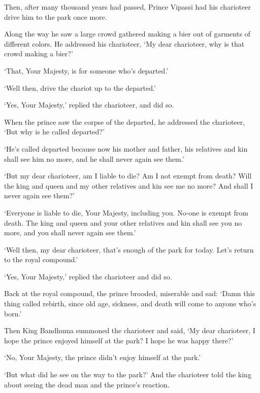\documentclass[12pt,openany]{book}%
\begin{document}
Then, after many thousand years had passed, Prince \textsanskrit{Vipassī} had his charioteer drive him to the park once more. 

Along the way he saw a large crowd gathered making a bier out of garments of different colors. He addressed his charioteer, ‘My dear charioteer, why is that crowd making a bier?’ 

‘That, Your Majesty, is for someone who’s departed.’ 

‘Well then, drive the chariot up to the departed.’ 

‘Yes, Your Majesty,’ replied the charioteer, and did so. 

When the prince saw the corpse of the departed, he addressed the charioteer, ‘But why is he called departed?’ 

‘He’s called departed because now his mother and father, his relatives and kin shall see him no more, and he shall never again see them.’ 

‘But my dear charioteer, am I liable to die? Am I not exempt from death? Will the king and queen and my other relatives and kin see me no more? And shall I never again see them?’ 

‘Everyone is liable to die, Your Majesty, including you. No-one is exempt from death. The king and queen and your other relatives and kin shall see you no more, and you shall never again see them.’ 

‘Well then, my dear charioteer, that’s enough of the park for today. Let’s return to the royal compound.’ 

‘Yes, Your Majesty,’ replied the charioteer and did so. 

Back at the royal compound, the prince brooded, miserable and sad: ‘Damn this thing called rebirth, since old age, sickness, and death will come to anyone who’s born.’ 

Then King Bandhuma summoned the charioteer and said, ‘My dear charioteer, I hope the prince enjoyed himself at the park? I hope he was happy there?’ 

‘No, Your Majesty, the prince didn’t enjoy himself at the park.’ 

‘But what did he see on the way to the park?’ And the charioteer told the king about seeing the dead man and the prince’s reaction. 
\end{document}
